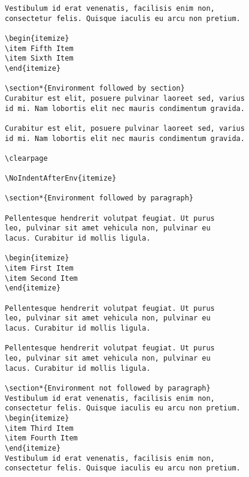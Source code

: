 \documentclass{scrartcl}
\begin{document}
\begin{verbatim}
Vestibulum id erat venenatis, facilisis enim non,
consectetur felis. Quisque iaculis eu arcu non pretium.

\begin{itemize}
\item Fifth Item
\item Sixth Item
\end{itemize}

\section*{Environment followed by section}
Curabitur est elit, posuere pulvinar laoreet sed, varius
id mi. Nam lobortis elit nec mauris condimentum gravida.

Curabitur est elit, posuere pulvinar laoreet sed, varius
id mi. Nam lobortis elit nec mauris condimentum gravida.

\clearpage

\NoIndentAfterEnv{itemize}

\section*{Environment followed by paragraph}

Pellentesque hendrerit volutpat feugiat. Ut purus
leo, pulvinar sit amet vehicula non, pulvinar eu
lacus. Curabitur id mollis ligula.

\begin{itemize}
\item First Item
\item Second Item
\end{itemize}

Pellentesque hendrerit volutpat feugiat. Ut purus
leo, pulvinar sit amet vehicula non, pulvinar eu
lacus. Curabitur id mollis ligula.

Pellentesque hendrerit volutpat feugiat. Ut purus
leo, pulvinar sit amet vehicula non, pulvinar eu
lacus. Curabitur id mollis ligula.

\section*{Environment not followed by paragraph}
Vestibulum id erat venenatis, facilisis enim non,
consectetur felis. Quisque iaculis eu arcu non pretium.
\begin{itemize}
\item Third Item
\item Fourth Item
\end{itemize}
Vestibulum id erat venenatis, facilisis enim non,
consectetur felis. Quisque iaculis eu arcu non pretium.


\end{verbatim}
\end{document}
